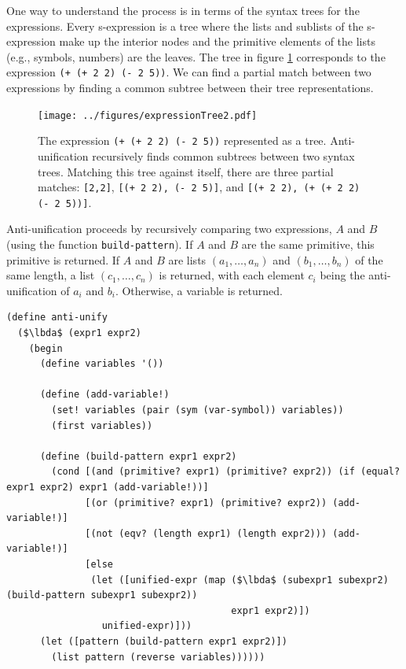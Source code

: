 \documentclass[a4paper,10pt]{article}
\newcommand{\lbda}{\color[rgb]{0,.3,.7} \lambda}
\begin{document}
One way to understand the process is in terms of the syntax trees for the expressions.  Every s-expression is a tree where the lists and sublists of the s-expression make up the interior nodes and the primitive elements of the lists (e.g., symbols, numbers) are the leaves.  The tree in figure \ref{expressionTree} corresponds to the expression \texttt{(+ (+ 2 2) (- 2 5))}. We can find a partial match between two expressions by finding a common subtree between their tree representations.
\begin{figure}[t]
\texttt{[image: ../figures/expressionTree2.pdf]}
  \caption{The expression \texttt{(+ (+ 2 2) (- 2 5))} represented as a tree. Anti-unification recursively finds common subtrees between two syntax trees. Matching this tree against itself, there are three partial matches: \texttt{[2,2]}, \texttt{[(+ 2 2), (- 2 5)]}, and \texttt{[(+ 2 2), (+ (+ 2 2) (- 2 5))]}.}
  \label{expressionTree}
\end{figure}

Anti-unification proceeds by recursively comparing two expressions, $A$ and $B$ (using the function \texttt{build-pattern}).  If $A$ and $B$ are the same primitive, this primitive is returned.  If $A$ and $B$ are lists $(a_1,\ldots,a_n)$ and $(b_1,\ldots,b_n)$ of the same length, a list $(c_1,\ldots,c_n)$ is returned, with each element $c_i$ being the anti-unification of $a_i$ and $b_i$.  Otherwise, a variable is returned.

\begin{lstlisting}[frame=trbl]
(define anti-unify
  ($\lbda$ (expr1 expr2)
    (begin
      (define variables '())

      (define (add-variable!)
        (set! variables (pair (sym (var-symbol)) variables))
        (first variables))
      
      (define (build-pattern expr1 expr2)
        (cond [(and (primitive? expr1) (primitive? expr2)) (if (equal? expr1 expr2) expr1 (add-variable!))]
              [(or (primitive? expr1) (primitive? expr2)) (add-variable!)]
              [(not (eqv? (length expr1) (length expr2))) (add-variable!)]
              [else
               (let ([unified-expr (map ($\lbda$ (subexpr1 subexpr2) (build-pattern subexpr1 subexpr2))
                                        expr1 expr2)])
                 unified-expr)]))
      (let ([pattern (build-pattern expr1 expr2)])
        (list pattern (reverse variables))))))
\end{lstlisting}
\end{document}
